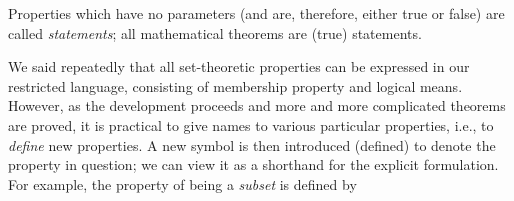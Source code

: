 \documentclass[12pt,a4paper,twoside,openany]{book}
\begin{document}
Properties which have no parameters (and are, therefore, either true or false) are called \textit{statements}; all mathematical theorems are (true) statements.

We said repeatedly that all set-theoretic properties can be expressed in our restricted language, consisting of membership property and logical means. However, as the development proceeds and more and more complicated theorems are proved, it is practical to give names to various particular properties, i.e., to \textit{define} new properties. A new symbol is then introduced (defined) to denote the property in question; we can view it as a shorthand for the explicit formulation. For example, the property of being a \textit{subset} is defined by

\end{document}
